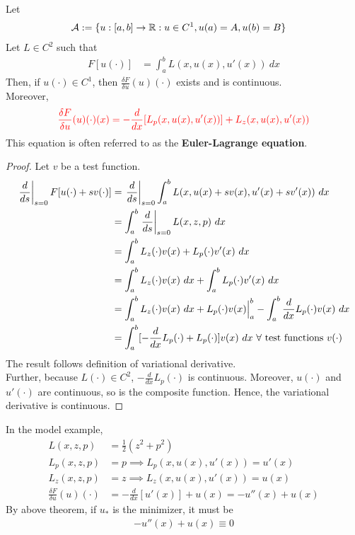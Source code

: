 \documentclass{article}
\begin{document}
	\begin{theorem}
		Let 
		\begin{align}
			\mathcal{{A}} &:=\{u:[a, b] \to \mathbb{R}:u \in C^1, u(a) = A, u(b) = B\}
		\end{align}
		Let $L \in C^2$ such that
		\begin{align}
			F[u(\cdot)] &= \int_a^b L(x, u(x), u'(x))\ dx
		\end{align}
		Then, if $u(\cdot) \in C^1$, then $\frac{\delta F}{\delta u}(u)(\cdot)$ exists and is continuous. \\
		Moreover,
		\begin{align}
			\textcolor{red}{\frac{\delta F}{\delta u}(u)(\cdot)(x) = - \frac{d}{dx} [L_p(x, u(x), u'(x))] + L_z(x, u(x), u'(x))}
		\end{align}
		This equation is often referred to as the \textbf{Euler-Lagrange  equation}.
	\end{theorem}
	
	\begin{proof}
		Let $v$ be a test function.
		\begin{align}
			\left. \frac{d}{ds} \right|_{s=0} F[u(\cdot) + sv(\cdot)]
			&= \left. \frac{d}{ds} \right|_{s=0} \int_a^b
			L(x, u(x) + sv(x), u'(x) + sv'(x))\ dx \\
			&= \int_a^b \left. \frac{d}{ds} \right|_{s=0}
			L(x, z, p)\ dx \\
			&= \int_a^b L_z(\cdot) v(x) + L_p(\cdot) v'(x)\ dx \\
			&= \int_a^b L_z(\cdot) v(x)\ dx + \int_a^b L_p(\cdot) v'(x)\ dx \\
			&= \int_a^b L_z(\cdot) v(x)\ dx + L_p(\cdot) v(x) \Big |_a^b - \int_a^b \frac{d}{dx} L_p(\cdot) v(x)\ dx \\
			&= \int_a^b [-\frac{d}{dx}L_p(\cdot) + L_p(\cdot)] v(x)\ dx\ \forall \tx{ test functions }v(\cdot)
		\end{align}
		The result follows definition of variational derivative. \\
		Further, because $L(\cdot) \in C^2$, $-\frac{d}{dx}L_p(\cdot)$ is continuous. Moreover, $u(\cdot)$ 	and $u'(\cdot)$ are continuous, so is the composite function. Hence, the variational derivative is continuous.
	\end{proof}
	
	\begin{example}
		In the model example,
		\begin{align}
			L(x, z, p) &= \frac{1}{2}(z^2 + p^2) \\
			L_p(x, z, p) &= p \implies L_p(x, u(x), u'(x)) = u'(x) \\
			L_z(x, z, p) &= z \implies L_z(x, u(x), u'(x)) = u(x) \\
			\frac{\delta F}{\delta u}(u)(\cdot) &= - \frac{d}{dx}[u'(x)] + u(x) = -u''(x) + u(x)
		\end{align}
		By above theorem, if $u_*$ is the minimizer, it must be
		\begin{align}
			-u''(x) + u(x) \equiv 0
		\end{align} 
	\end{example}
	
\end{document}

